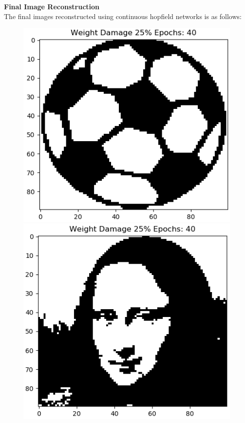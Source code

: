 \documentclass[12pt,a4paper]{article}
\newcommand{\noi}{\noindent}
\begin{document}
\noi
\textbf{Final Image Reconstruction}\\
The final images reconstructed using continuous hopfield networks is as follows:
\begin{figure}[H]
\centering
\includegraphics[scale=0.34]{images/ball_chn_25_end.png}
\includegraphics[scale=0.34]{images/mona_chn_25_end.png}

\end{figure}
\end{document}
